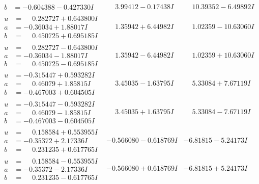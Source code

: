 \documentclass[1p]{elsarticle_modified}
\theoremstyle{definition}
\begin{document}
$$\begin{array}{c|c|c}
\begin{aligned}
b &= -0.604388 - 0.427330 I\end{aligned}
 & \phantom{-}3.99412 - 0.17438 I & \phantom{-}10.39352 - 6.49892 I \\ \hline\begin{aligned}
u &= \phantom{-}0.282727 + 0.643800 I \\
a &= -0.36034 + 1.88017 I \\
b &= \phantom{-}0.450725 + 0.695185 I\end{aligned}
 & \phantom{-}1.35942 + 6.44982 I & \phantom{-}1.02359 - 10.63060 I \\ \hline\begin{aligned}
u &= \phantom{-}0.282727 - 0.643800 I \\
a &= -0.36034 - 1.88017 I \\
b &= \phantom{-}0.450725 - 0.695185 I\end{aligned}
 & \phantom{-}1.35942 - 6.44982 I & \phantom{-}1.02359 + 10.63060 I \\ \hline\begin{aligned}
u &= -0.315447 + 0.593282 I \\
a &= \phantom{-}0.46079 + 1.85815 I \\
b &= -0.467003 + 0.604505 I\end{aligned}
 & \phantom{-}3.45035 - 1.63795 I & \phantom{-}5.33084 + 7.67119 I \\ \hline\begin{aligned}
u &= -0.315447 - 0.593282 I \\
a &= \phantom{-}0.46079 - 1.85815 I \\
b &= -0.467003 - 0.604505 I\end{aligned}
 & \phantom{-}3.45035 + 1.63795 I & \phantom{-}5.33084 - 7.67119 I \\ \hline\begin{aligned}
u &= \phantom{-}0.158584 + 0.553955 I \\
a &= -0.35372 + 2.17336 I \\
b &= \phantom{-}0.231235 + 0.617765 I\end{aligned}
 & -0.566080 - 0.618769 I & -6.81815 - 5.24173 I \\ \hline\begin{aligned}
u &= \phantom{-}0.158584 - 0.553955 I \\
a &= -0.35372 - 2.17336 I \\
b &= \phantom{-}0.231235 - 0.617765 I\end{aligned}
 & -0.566080 + 0.618769 I & -6.81815 + 5.24173 I \\ \hline\begin{aligned}

\end{aligned}
\end{array}$$
\end{document}
